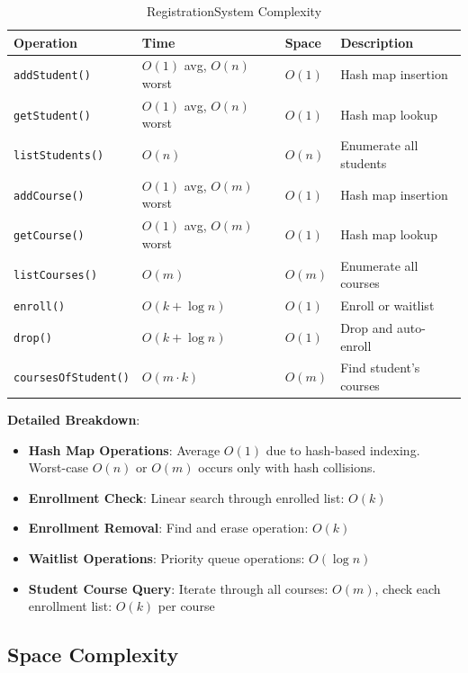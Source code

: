 \documentclass[12pt,a4paper]{article}
\begin{document}
\begin{table}[h]
\centering
\begin{tabular}{@{}llll@{}}
\toprule
\textbf{Operation} & \textbf{Time} & \textbf{Space} & \textbf{Description} \\
\midrule
\texttt{addStudent()} & $O(1)$ avg, $O(n)$ worst & $O(1)$ & Hash map insertion \\
\texttt{getStudent()} & $O(1)$ avg, $O(n)$ worst & $O(1)$ & Hash map lookup \\
\texttt{listStudents()} & $O(n)$ & $O(n)$ & Enumerate all students \\
\texttt{addCourse()} & $O(1)$ avg, $O(m)$ worst & $O(1)$ & Hash map insertion \\
\texttt{getCourse()} & $O(1)$ avg, $O(m)$ worst & $O(1)$ & Hash map lookup \\
\texttt{listCourses()} & $O(m)$ & $O(m)$ & Enumerate all courses \\
\texttt{enroll()} & $O(k + \log n)$ & $O(1)$ & Enroll or waitlist \\
\texttt{drop()} & $O(k + \log n)$ & $O(1)$ & Drop and auto-enroll \\
\texttt{coursesOfStudent()} & $O(m \cdot k)$ & $O(m)$ & Find student's courses \\
\bottomrule
\end{tabular}
\caption{RegistrationSystem Complexity}
\end{table}

\textbf{Detailed Breakdown}:
\begin{itemize}
    \item \textbf{Hash Map Operations}: Average $O(1)$ due to hash-based indexing. Worst-case $O(n)$ or $O(m)$ occurs only with hash collisions.
    \item \textbf{Enrollment Check}: Linear search through enrolled list: $O(k)$
    \item \textbf{Enrollment Removal}: Find and erase operation: $O(k)$
    \item \textbf{Waitlist Operations}: Priority queue operations: $O(\log n)$
    \item \textbf{Student Course Query}: Iterate through all courses: $O(m)$, check each enrollment list: $O(k)$ per course
\end{itemize}

\subsection{Space Complexity}
\end{document}
